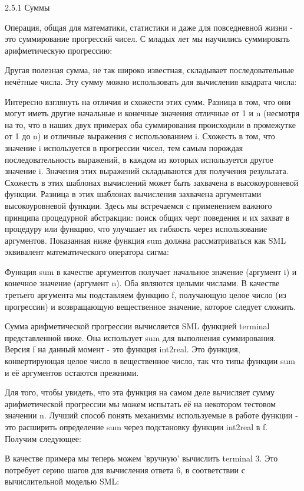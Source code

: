 2.5.1 Суммы

Операция, общая для математики, статистики и даже для повседневной жизни - это суммирование прогрессий чисел. С младых лет мы научились суммировать арифметическую прогрессию:

Другая полезная сумма, не так широко известная, складывает последовательные нечётные числа. Эту сумму можно использовать для вычисления квадрата числа:

Интересно взглянуть на отличия и схожести этих сумм. Разница в том, что они могут иметь другие начальные и конечные значения отличные от 1 и n (несмотря на то, что в наших двух примерах оба суммирования происходили в промежутке от 1 до n) и отличные выражения с использованием i. Схожесть в том, что значение i используется в прогрессии чисел, тем самым порождая последовательность выражений, в каждом из которых используется другое значение i. Значения этих выражений складываются для получения результата. Схожесть в этих шаблонах вычислений может быть захвачена в высокоуровневой функции. Разница в этих шаблонах вычисления захвачена аргументами высокоуровневой функции. Здесь мы встречаемся с применением важного принципа процедурной абстракции: поиск общих черт поведения и их захват в процедуру или функцию, что улучшает их гибкость через использование аргументов. Показанная ниже функция sum должна рассматриваться как SML эквивалент математического оператора сигма:

Функция sum в качестве аргументов получает начальное значение (аргумент i) и конечное значение (аргумент n). Оба являются целыми числами. В качестве третьего аргумента мы подставляем функцию f, получающую целое число (из прогрессии) и возвращающую вещественное значение, которое следует сложить.

Сумма арифметической прогрессии вычисляется SML функцией terminal представленной ниже. Она использует sum для выполнения суммирования. Версия f на данный момент - это функция int2real. Это функция, конвертирующая целое число в вещественное число, так что типы функции sum и её аргументов остаются прежними.

Для того, чтобы увидеть, что эта функция на самом деле вычисляет сумму арифметической прогрессии мы можем испытать её на некотором тестовом значении n. Лучший способ понять механизмы используемые в работе функции - это расширить определение sum через подстановку функции int2real в f. Получим следующее:

В качестве примера мы теперь можем 'вручную' вычислить terminal 3. Это потребует серию шагов для вычисления ответа 6, в соответствии с вычислительной моделью SML:

